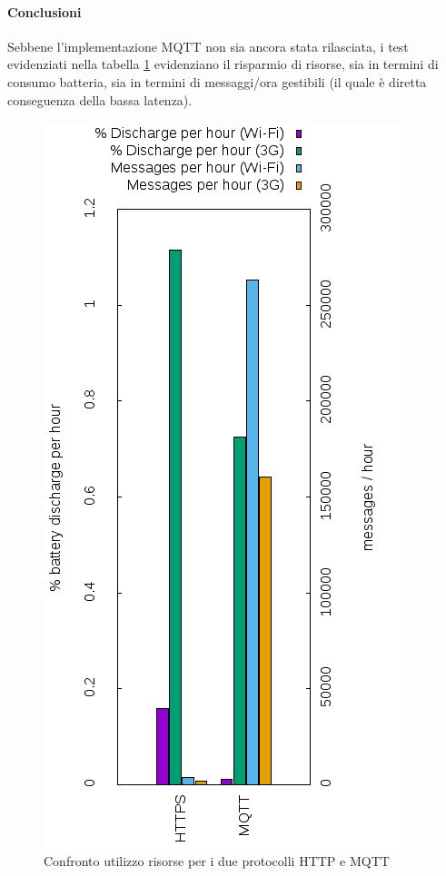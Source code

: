 \documentclass[a4paper,10pt]{memoir}
\begin{document}
\paragraph{Conclusioni} Sebbene l'implementazione MQTT non sia ancora stata rilasciata, i test evidenziati nella tabella \ref{fig:networkperformance} evidenziano il risparmio di risorse, sia in termini di consumo batteria, sia in termini di messaggi/ora gestibili (il quale è diretta conseguenza della bassa latenza).

\pagebreak

\begin{figure}[ht]
\centering
\caption{Confronto utilizzo risorse per i due protocolli HTTP e MQTT}
\label{fig:networkperformance}
\includegraphics[scale=0.8]{database/networkperformance}
\end{figure}
\end{document}
